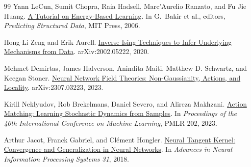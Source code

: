 \documentclass[11pt,letterpaper]{article}
\begin{document}
\begin{thebibliography}{99}
Yann LeCun, Sumit Chopra, Raia Hadsell, Marc'Aurelio Ranzato, and Fu Jie
Huang.
\newblock
\href{https://yann.lecun.org/exdb/publis/pdf/lecun-06.pdf}{A Tutorial on
Energy-Based Learning}.
\newblock In G.~Bakir et al., editors, \emph{Predicting Structured Data},
MIT Press, 2006.

Hong-Li Zeng and Erik Aurell.
\newblock
\href{https://arxiv.org/abs/2002.05222}{Inverse Ising Techniques to Infer
Underlying Mechanisms from Data}.
\newblock arXiv:2002.05222, 2020.

Mehmet Demirtas, James Halverson, Anindita Maiti, Matthew D. Schwartz, and
Keegan Stoner.
\newblock
\href{https://arxiv.org/abs/2307.03223}{Neural Network Field Theories:
Non-Gaussianity, Actions, and Locality}.
\newblock arXiv:2307.03223, 2023.

Kirill Neklyudov, Rob Brekelmans, Daniel Severo, and Alireza Makhzani.
\newblock
\href{https://arxiv.org/abs/2210.06662}{Action Matching: Learning Stochastic
Dynamics from Samples}.
\newblock In \emph{Proceedings of the 40th International Conference on
Machine Learning}, PMLR 202, 2023.

Arthur Jacot, Franck Gabriel, and Cl\'ement Hongler.
\newblock
\href{https://papers.nips.cc/paper_files/paper/2018/hash/5a4be1fa34e62bb8a6ec6b91d2462f5a-Abstract.html}{Neural
Tangent Kernel: Convergence and Generalization in Neural Networks}.
\newblock In \emph{Advances in Neural Information Processing Systems 31},
2018.

\end{thebibliography}
\end{document}
